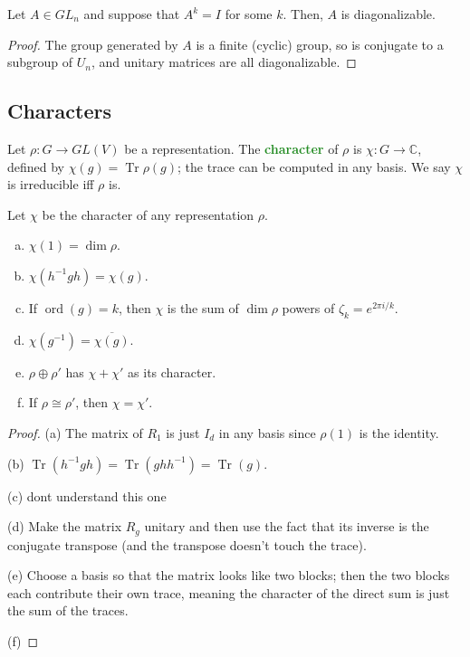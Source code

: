 \documentclass[10pt]{scrartcl}
\providecommand{\ol}{\overline}
\providecommand{\CC}{\mathbb C}
\providecommand{\ii}{\item}
\providecommand{\opname}{\operatorname}
\providecommand{\inv}{^{-1}}
\providecommand{\vocab}[1]{{\textbf{\textcolor{ForestGreen}{#1}}}}
\providecommand{\ord}{\operatorname{ord}}
\begin{document}
\begin{corollary}
	Let $A\in GL_n$ and suppose that $A^k = I$ for some $k$.
	Then, $A$ is diagonalizable.
\end{corollary}

\begin{proof}
	The group generated by $A$ is a finite (cyclic) group,
	so is conjugate to a subgroup of $U_n$, and unitary matrices
	are all diagonalizable.
\end{proof}

\subsection{Characters}
\begin{definition}
	Let $\rho\colon G\to GL(V)$ be a representation.
	The \vocab{character} of $\rho$ is $\chi\colon G\to\CC$, defined by
	$\chi(g) = \opname{Tr}\rho(g)$; the trace can be computed
	in any basis. We say $\chi$ is irreducible iff $\rho$ is.
\end{definition}

\begin{prop}
	Let $\chi$ be the character of any representation $\rho$.
	\begin{enumerate}[(a)]
		\ii $\chi(1) = \dim\rho$.
		\ii $\chi(h\inv gh) = \chi(g)$.
		\ii If $\ord(g) = k$, then $\chi$ is the sum of $\dim\rho$ powers
		of $\zeta_k = e^{2\pi i/k}$.
		\ii $\chi(g\inv) = \ol{\chi(g)}$.
		\ii $\rho\oplus\rho'$ has $\chi + \chi'$ as its character.
		\ii If $\rho\cong\rho'$, then $\chi = \chi'$.
	\end{enumerate}
\end{prop}

\begin{proof}
	(a) The matrix of $R_1$ is just $I_d$ in any basis
	since $\rho(1)$ is the identity.
	
	(b) $\opname{Tr}(h\inv gh) = \opname{Tr}(ghh\inv) = \opname{Tr}(g)$.
	
	(c) dont understand this one
	
	(d) Make the matrix $R_g$ unitary and then use the fact that
	its inverse is the conjugate transpose (and the transpose
	doesn't touch the trace).
	
	(e) Choose a basis so that the matrix looks like
	two blocks; then the two blocks each contribute
	their own trace, meaning the character of the direct sum
	is just the sum of the traces.
	
	(f) 
\end{proof}
\end{document}
